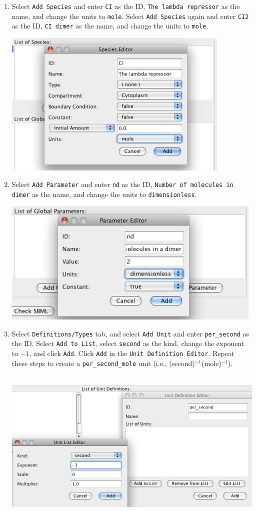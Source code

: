 \documentclass[titlepage,11pt]{article}
\begin{document}
\begin{enumerate}
\item Select {\tt Add Species} and enter {\tt CI} as the ID, 
{\tt The lambda repressor} as the name, and change the units 
to {\tt mole}.  Select {\tt Add Species} again and enter {\tt CI2} as the ID,
{\tt CI dimer} as the name, and change the units to {\tt mole}.

\includegraphics[height=70mm]{screenshots/species}

\item Select {\tt Add Parameter} and enter {\tt nd} as the ID,
      {\tt Number of molecules in dimer} as the name, and change the
      units to {\tt dimensionless}.

\includegraphics[height=60mm]{screenshots/parameter}

\item Select {\tt Definitions/Types} tab, and select {\tt Add Unit}
      and enter {\tt per\_second} as the ID.  Select {\tt Add to List}, 
      select {\tt second} as the kind, change the exponent to $-1$, 
      and click {\tt Add}.  Click {\tt Add} in the {\tt Unit Definition Editor}.
      Repeat these steps to create a {\tt per\_second\_mole} unit 
      (i.e., (second)$^{-1}$(mole)$^{-1}$).

\includegraphics[height=75mm]{screenshots/units}


\end{enumerate}
\end{document}
